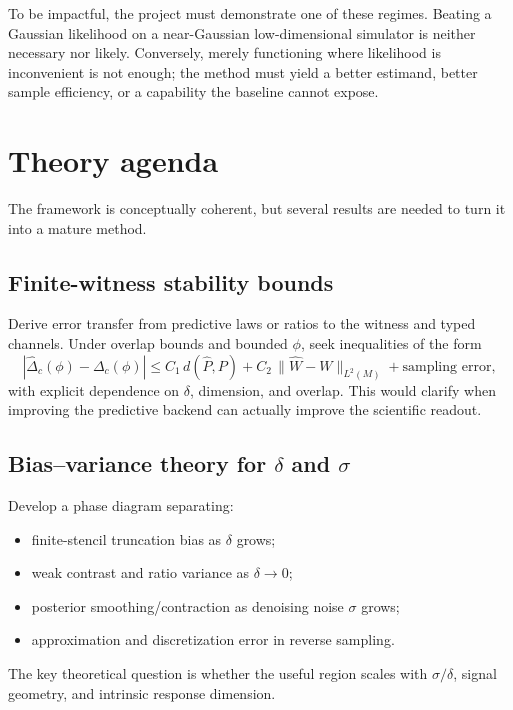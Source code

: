 \documentclass[10pt]{article}
\begin{document}
To be impactful, the project must demonstrate one of these regimes. Beating a Gaussian likelihood on a near-Gaussian low-dimensional simulator is neither necessary nor likely. Conversely, merely functioning where likelihood is inconvenient is not enough; the method must yield a better estimand, better sample efficiency, or a capability the baseline cannot expose.

\section{Theory agenda}

The framework is conceptually coherent, but several results are needed to turn it into a mature method.

\subsection{Finite-witness stability bounds}

Derive error transfer from predictive laws or ratios to the witness and typed channels. Under overlap bounds and bounded \(\phi\), seek inequalities of the form
\[
  \left|\widehat\Delta_c(\phi)-\Delta_c(\phi)\right|
  \leq C_1\,d(\widehat P,P)+C_2\,\|\widehat W-W\|_{L^2(M)}
  +\text{sampling error},
\]
with explicit dependence on \(\delta\), dimension, and overlap. This would clarify when improving the predictive backend can actually improve the scientific readout.

\subsection{Bias--variance theory for \(\delta\) and \(\sigma\)}

Develop a phase diagram separating:

\begin{itemize}
  \item finite-stencil truncation bias as \(\delta\) grows;
  \item weak contrast and ratio variance as \(\delta\to0\);
  \item posterior smoothing/contraction as denoising noise \(\sigma\) grows;
  \item approximation and discretization error in reverse sampling.
\end{itemize}

The key theoretical question is whether the useful region scales with \(\sigma/\delta\), signal geometry, and intrinsic response dimension.
\end{document}
